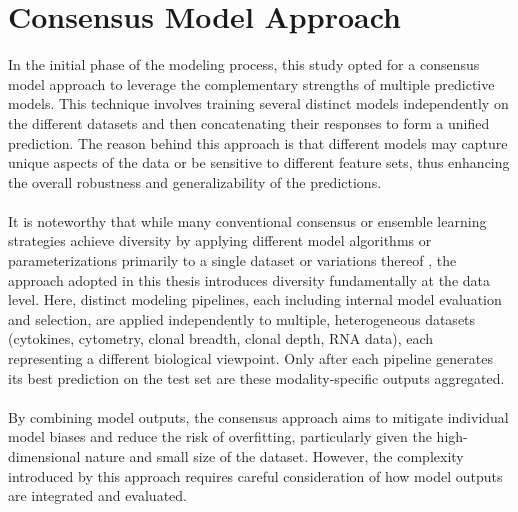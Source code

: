 \documentclass[12pt,a4paper]{report}
\begin{document}
\section{Consensus Model Approach}
\label{sec:consensus_model_approach}
\noindent
In the initial phase of the modeling process, this study opted for a consensus model approach to leverage the complementary strengths of multiple predictive models. This technique involves training several distinct models independently on the different datasets and then concatenating their responses to form a unified prediction. The reason behind this approach is that different models may capture unique aspects of the data or be sensitive to different feature sets, thus enhancing the overall robustness and generalizability of the predictions.\\
\\
It is noteworthy that while many conventional consensus or ensemble learning strategies achieve diversity by applying different model algorithms or parameterizations primarily to a single dataset or variations thereof \cite{Rokach2010}, the approach adopted in this thesis introduces diversity fundamentally at the data level. Here, distinct modeling pipelines, each including internal model evaluation and selection, are applied independently to multiple, heterogeneous datasets (cytokines, cytometry, clonal breadth, clonal depth, RNA data), each representing a different biological viewpoint. Only after each pipeline generates its best prediction on the test set are these modality-specific outputs aggregated.\\
\\
By combining model outputs, the consensus approach aims to mitigate individual model biases and reduce the risk of overfitting, particularly given the high-dimensional nature and small size of the dataset. However, the complexity introduced by this approach requires careful consideration of how model outputs are integrated and evaluated.
\end{document}
